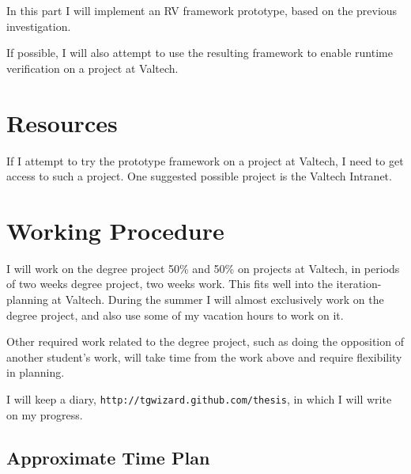 \documentclass[a4paper,11pt]{article}
\begin{document}
In this part I will implement an RV framework prototype, based on the previous
investigation.

If possible, I will also attempt to use the resulting framework to enable runtime verification on a project at Valtech.


\section{Resources}

If I attempt to try the prototype framework on a project at Valtech, I need to get access to such a project. One suggested possible project is the Valtech Intranet.


\section{Working Procedure}

I will work on the degree project 50\% and 50\% on projects at Valtech, in periods of
two weeks degree project, two weeks work. This fits well into the iteration-planning at
Valtech. During the summer I will almost exclusively work on the degree project, and also
use some of my vacation hours to work on it.

Other required work related to the degree project, such as doing the opposition of
another student's work, will take time from the work above and require
flexibility in planning.

I will keep a diary, \texttt{http://tgwizard.github.com/thesis}, in which I will write on my progress. 

\subsection{Approximate Time Plan}
\end{document}

